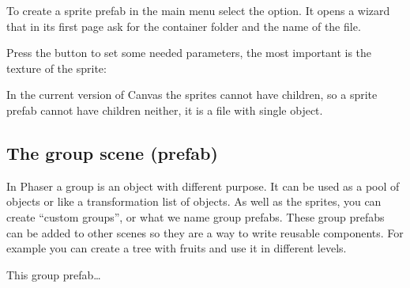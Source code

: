 \documentclass[letterpaper,10pt,english]{sphinxmanual}
\begin{document}
\begin{sphinxVerbatim}[commandchars=\\\{\}]

          
          


   
  
  

\end{sphinxVerbatim}

To create a sprite prefab in the main menu select the  option. It opens a wizard that in its first page ask for the container folder and the name of the file.

Press the  button to set some needed parameters, the most important is the texture of the sprite:

\noindent{}

In the current version of Canvas the sprites cannot have children, so a sprite prefab cannot have children neither, it is a file with single object.


\subsection{The group scene (prefab)}
\label{\detokenize{canvas:the-group-scene-prefab}}
In Phaser a group is an object with different purpose. It can be used as a pool of objects or like a transformation list of objects. As well as the sprites, you can create “custom groups”, or what we name group prefabs. These group prefabs can be added to other scenes so they are a way to write reusable components. For example you can create a tree with fruits and use it in different levels.

This group prefab…
\end{document}
